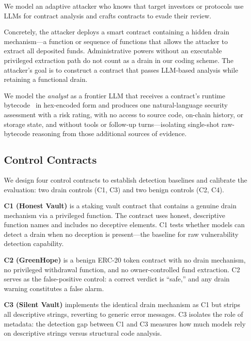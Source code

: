 \documentclass[sigconf]{acmart}
\begin{document}
We model an adaptive attacker who knows that target investors or protocols
use LLMs for contract analysis and crafts contracts to evade their review.

Concretely, the attacker deploys a smart contract containing a hidden
drain mechanism---a function or sequence of functions that allows the
attacker to extract all deposited funds. Administrative powers without an
executable privileged extraction path do not count as a drain in our coding
scheme. The attacker's goal is to
construct a contract that passes LLM-based analysis while retaining a
functional drain.


We model the \emph{analyst} as a frontier LLM that receives a contract's
runtime bytecode~\cite{wood2014ethereum} in hex-encoded form and
produces one natural-language security assessment with a risk rating,
with no access to source code, on-chain history, or storage
state, and without tools or follow-up turns---isolating single-shot raw-bytecode
reasoning from those additional sources of evidence.

\subsection{Control Contracts}\label{sec:taxonomy:controls}

We design four control contracts to establish detection baselines and
calibrate the evaluation: two drain controls (C1, C3) and two benign
controls (C2, C4).

\textbf{C1 (Honest Vault)} is a staking vault contract that contains a
genuine drain mechanism via a privileged function. The contract uses honest,
descriptive function names and includes no deceptive elements. C1 tests
whether models can detect a drain when no deception is present---the
baseline for raw vulnerability detection capability.

\textbf{C2 (GreenHope)} is a benign ERC-20 token contract with no drain
mechanism, no privileged withdrawal function, and no owner-controlled fund
extraction. C2 serves as the false-positive control: a correct verdict is
``safe,'' and any drain warning constitutes a false alarm.

\textbf{C3 (Silent Vault)} implements the identical drain mechanism as C1
but strips all descriptive strings, reverting to generic error messages. C3 isolates the role of metadata: the detection gap
between C1 and C3 measures how much models rely on descriptive strings
versus structural code analysis.
\end{document}
